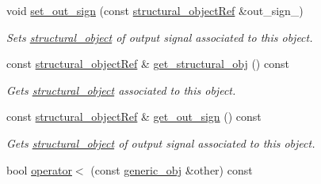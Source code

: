 \begin{DoxyCompactItemize}
void \hyperlink{classgeneric__obj_a08d8b6f56118e18065695da3d9a5b969}{set\+\_\+out\+\_\+sign} (const \hyperlink{structural__objects_8hpp_a8ea5f8cc50ab8f4c31e2751074ff60b2}{structural\+\_\+object\+Ref} \&out\+\_\+sign\+\_\+)
\begin{DoxyCompactList}\small\item\em Sets \hyperlink{classstructural__object}{structural\+\_\+object} of output signal associated to this object. \end{DoxyCompactList}\item 
const \hyperlink{structural__objects_8hpp_a8ea5f8cc50ab8f4c31e2751074ff60b2}{structural\+\_\+object\+Ref} \& \hyperlink{classgeneric__obj_a1de67b6b028dd7548f5ce367779cec25}{get\+\_\+structural\+\_\+obj} () const
\begin{DoxyCompactList}\small\item\em Gets \hyperlink{classstructural__object}{structural\+\_\+object} associated to this object. \end{DoxyCompactList}\item 
const \hyperlink{structural__objects_8hpp_a8ea5f8cc50ab8f4c31e2751074ff60b2}{structural\+\_\+object\+Ref} \& \hyperlink{classgeneric__obj_afd9c00bb476ce032d39f6df069184304}{get\+\_\+out\+\_\+sign} () const
\begin{DoxyCompactList}\small\item\em Gets \hyperlink{classstructural__object}{structural\+\_\+object} of output signal associated to this object. \end{DoxyCompactList}\item 
bool \hyperlink{classgeneric__obj_a45eb078e658219090365fa966fa1a759}{operator$<$} (const \hyperlink{classgeneric__obj}{generic\+\_\+obj} \&other) const
\end{DoxyCompactItemize}
